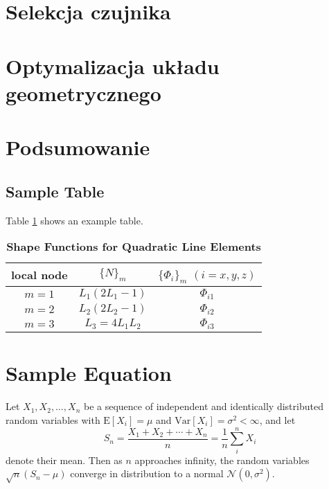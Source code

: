 \documentclass[9pt,twocolumn,twoside]{optica}
\begin{document}
\section{Selekcja czujnika}
\label{sec:sensor_selection}

\section{Optymalizacja układu geometrycznego}
\label{sec:construction_optymization}
\section{Podsumowanie}
\label{sec:conclusion}


\subsection{Sample Table}

Table \ref{tab:shape-functions} shows an example table.

\begin{table}[htbp]
\centering
\caption{\bf Shape Functions for Quadratic Line Elements}
\begin{tabular}{ccc}
\hline
local node & $\{N\}_m$ & $\{\Phi_i\}_m$ $(i=x,y,z)$ \\
\hline
$m = 1$ & $L_1(2L_1-1)$ & $\Phi_{i1}$ \\
$m = 2$ & $L_2(2L_2-1)$ & $\Phi_{i2}$ \\
$m = 3$ & $L_3=4L_1L_2$ & $\Phi_{i3}$ \\
\hline
\end{tabular}
  \label{tab:shape-functions}
\end{table}

\section{Sample Equation}

Let $X_1, X_2, \ldots, X_n$ be a sequence of independent and identically distributed random variables with $\text{E}[X_i] = \mu$ and $\text{Var}[X_i] = \sigma^2 < \infty$, and let
\begin{equation}
S_n = \frac{X_1 + X_2 + \cdots + X_n}{n}
      = \frac{1}{n}\sum_{i}^{n} X_i
\label{eq:refname1}
\end{equation}
denote their mean. Then as $n$ approaches infinity, the random variables $\sqrt{n}(S_n - \mu)$ converge in distribution to a normal $\mathcal{N}(0, \sigma^2)$.
\end{document}
